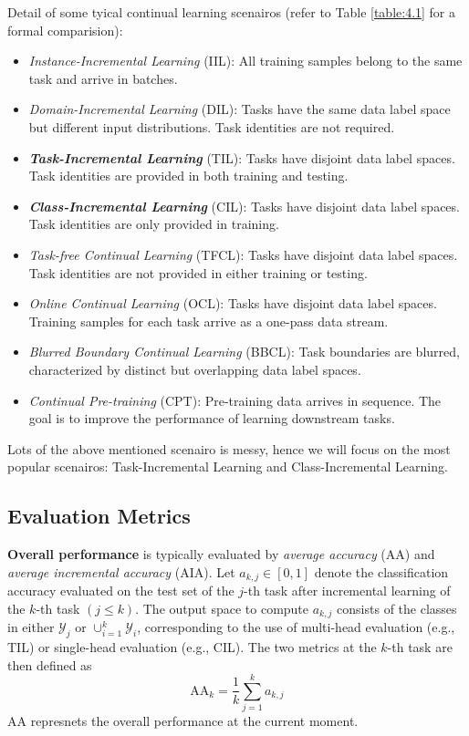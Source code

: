 Detail of some tyical continual learning scenairos (refer to Table \ref{table:4.1} for a formal comparision):
\begin{itemize}
    \item \textit{Instance-Incremental Learning} (IIL): All training samples belong to the same task and arrive in batches.
    \item \textit{Domain-Incremental Learning} (DIL): Tasks have the same data label space but different input distributions. Task identities are not required.
    \item \textbf{\textit{Task-Incremental Learning}} (TIL): Tasks have disjoint data label spaces. Task identities are provided in both training and testing.
    \item \textbf{\textit{Class-Incremental Learning}} (CIL): Tasks have disjoint data label spaces. Task identities are only provided in training.
    \item \textit{Task-free Continual Learning} (TFCL): Tasks have disjoint data label spaces. Task identities are not provided in either training or testing.
    \item \textit{Online Continual Learning} (OCL): Tasks have disjoint data label spaces. Training samples for each task arrive as a one-pass data stream.
    \item \textit{Blurred Boundary Continual Learning} (BBCL): Task boundaries are blurred, characterized by distinct but overlapping data label spaces.
    \item \textit{Continual Pre-training} (CPT): Pre-training data arrives in sequence. The goal is to improve the performance of learning downstream tasks.
\end{itemize}

Lots of the above mentioned scenairo is messy, hence we will focus on the most popular scenairos: Task-Incremental Learning and Class-Incremental Learning.

\subsection{Evaluation Metrics}
\textbf{Overall performance} is typically evaluated by \textit{average accuracy} (AA) and \textit{average incremental accuracy} (AIA). Let \(a_{k, j} \in[0,1]\) denote the classification accuracy evaluated on the test set of the \(j\)-th task after incremental learning of the \(k\)-th task \((j \leq k)\). The output space to compute \(a_{k, j}\) consists of the classes in either \(\mathcal{Y}_{j}\) or \(\cup_{i=1}^{k} \mathcal{Y}_{i}\),  corresponding to the use of multi-head evaluation (e.g., TIL) or single-head evaluation (e.g., CIL). The two metrics at the \(k\)-th task are then defined as
\begin{equation*}
    \mathrm{AA}_{k}=\frac{1}{k} \sum_{j=1}^{k} a_{k, j}
\end{equation*}
AA represnets the overall performance at the current moment.

